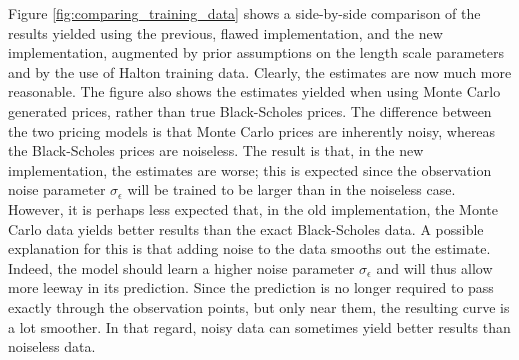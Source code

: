 \documentclass[a4paper,12pt]{article}
\begin{document}
Figure \ref{fig:comparing_training_data} shows a side-by-side comparison of the results yielded using the previous, flawed implementation, and the new implementation, augmented by prior assumptions on the length scale parameters and by the use of Halton training data. Clearly, the estimates are now much more reasonable. The figure also shows the estimates yielded when using Monte Carlo generated prices, rather than true Black-Scholes prices. The difference between the two pricing models is that Monte Carlo prices are inherently noisy, whereas the Black-Scholes prices are noiseless. The result is that, in the new implementation, the estimates are worse; this is expected since the observation noise parameter $\sigma_\epsilon$ will be trained to be larger than in the noiseless case. However, it is perhaps less expected that, in the old implementation, the Monte Carlo data yields better results than the exact Black-Scholes data. A possible explanation for this is that adding noise to the data smooths out the estimate. Indeed, the model should learn a higher noise parameter $\sigma_\epsilon$ and will thus allow more leeway in its prediction. Since the prediction is no longer required to pass exactly through the observation points, but only near them, the resulting curve is a lot smoother. In that regard, noisy data can sometimes yield better results than noiseless data.\\
\end{document}
